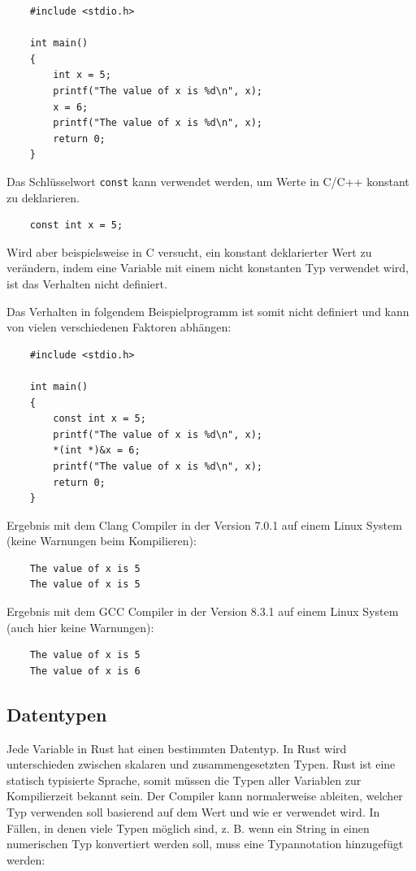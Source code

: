 \begin{lstlisting}
    #include <stdio.h>

    int main()
    {
        int x = 5;
        printf("The value of x is %d\n", x);
        x = 6;
        printf("The value of x is %d\n", x);
        return 0;
    }    
\end{lstlisting}

Das Schlüsselwort \verb"const" kann verwendet werden, um Werte in C/C++ konstant zu deklarieren.

\begin{lstlisting}
    const int x = 5;
\end{lstlisting}

Wird aber beispielsweise in C versucht, ein konstant deklarierter Wert zu ver\-än\-dern, indem eine Variable mit einem nicht konstanten Typ verwendet wird, ist das Verhalten nicht definiert. \cite[p.~87]{ISO:9899:2017}

Das Verhalten in folgendem Beispielprogramm ist somit nicht definiert und kann von vielen verschiedenen Faktoren abhängen:

\begin{lstlisting}
    #include <stdio.h>

    int main()
    {
        const int x = 5;
        printf("The value of x is %d\n", x);
        *(int *)&x = 6;
        printf("The value of x is %d\n", x);
        return 0;
    }
\end{lstlisting}

Ergebnis mit dem Clang Compiler in der Version 7.0.1 auf einem Linux System (keine Warnungen beim Kompilieren):

\begin{lstlisting}
    The value of x is 5
    The value of x is 5
\end{lstlisting}

Ergebnis mit dem GCC Compiler in der Version 8.3.1 auf einem Linux System (auch hier keine Warnungen):

\begin{lstlisting}
    The value of x is 5
    The value of x is 6
\end{lstlisting}

\subsection{Datentypen}\label{chap:datatypes}

Jede Variable in Rust hat einen bestimmten Datentyp. In Rust wird unterschieden zwischen skalaren und zusammengesetzten Typen. Rust ist eine statisch typisierte Sprache, somit müssen die Typen aller Variablen zur Kompilierzeit bekannt sein. Der Compiler kann normalerweise ableiten, welcher Typ verwenden soll basierend auf dem Wert und wie er verwendet wird. In Fällen, in denen viele Typen möglich sind, z. B. wenn ein String in einen numerischen Typ konvertiert werden soll, muss eine Typannotation hinzugefügt werden:

